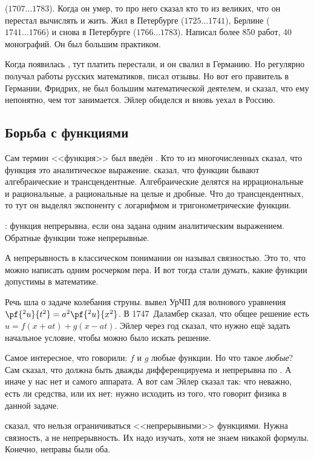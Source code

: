 \documentclass[a4paper,oneside,fleqn,10pt]{article}
\newcommand{\pe}[2]{${#1}\ldots{#2}$}
\begin{document}
 (\pe{1707}{1783}). Когда он умер, то про него сказал кто
то из великих, что он перестал вычислять и жить.  Жил в Петербурге
(\pe{1725}{1741}), Берлине (\pe{1741}{1766}) и снова в Петербурге
(\pe{1766}{1783}).  Написал более 850 работ, 40 монографий. Он был
большим практиком.

Когда появилась , тут платить перестали, и он
свалил в Германию.  Но регулярно получал работы русских математиков,
писал отзывы. Но вот его правитель в Германии, Фридрих, не был большим
математической деятелем, и сказал, что ему непонятно, чем тот
занимается.  Эйлер обиделся и вновь уехал в Россию.

\subsection{Борьба с функциями}

Сам термин <<функция>> был введён . Кто то
из многочисленных  сказал, что функция это
аналитическое выражение.   сказал, что функции бывают
алгебраические и трансцендентные.  Алгебраические делятся на
иррациональные и рациональные, а рациональные на целые и дробные.  Что
до трансцендентных, то тут он выделял экспоненту с логарифмом и
тригонометрические функции.

: функция непрерывна, если она задана одним аналитическим
выражением.  Обратные функции тоже непрерывные.

А непрерывность в классическом понимании он называл связностью. Это
то, что можно написать одним росчерком пера. И вот тогда стали думать,
какие функции допустимы в математике.

Речь шла о задаче колебания струны.  вывел УрЧП для
волнового уравнения $\pf{^2 u}{t^2} = a^2\pf{^2u}{x^2}$.  В
1747~Даламбер сказал, что общее решение есть $u = f(x+at) +
g(x-at)$. Эйлер через год сказал, что нужно ещё задать начальное
условие, чтобы можно было искать решение.

Самое интересное, что говорили: $f$ и $g$ любые функции. Но что такое
\emph{любые}?  Сам  сказал, что должна быть дважды
дифференцируема и непрерывна по .  А иначе у нас
нет и самого аппарата. А вот сам Эйлер сказал так: что неважно, есть
ли средства, или их нет: нужно исходить из того, что говорит физика в
данной задаче.

 сказал, что нельзя ограничиваться <<непрерывными>>
функциями. Нужна связность, а не непрерывность. Их надо изучать, хотя
не знаем никакой формулы.  Конечно, неправы были оба.
\end{document}
